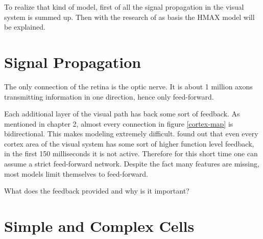 	To realize that kind of model, first of all the signal propagation in the visual system is summed up. Then with the research of \citep{hubel1962receptive} as basis the HMAX model will be explained.

%		
%		
%		
%		
%		
%
%			
%			
	
		
	\section{Signal Propagation}\label{signal}
		
		The only connection of the retina is the optic nerve. It is about 1 million axons transmitting information in one direction, hence only feed-forward.
		
		Each additional layer of the visual path has back some sort of feedback. As mentioned in chapter 2, almost every connection in figure \ref{cortex-map} is bidirectional. This makes modeling extremely difficult. \citeauthor{thorpe1996speed} found out that even every cortex area of the visual system has some sort of higher function level feedback, in the first 150 milliseconds it is not active. Therefore for this short time one can assume a strict feed-forward network. Despite the fact many features are missing, most models limit themselves to feed-forward.
		
		What does the feedback provided and why is it important?
		
	\section{Simple and Complex Cells}
		
